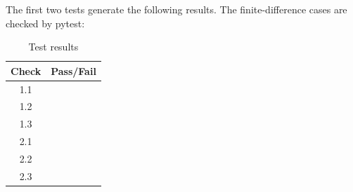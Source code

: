 The first two tests generate the following results. The finite-difference cases are checked by pytest:
\begin{table}[H]
	\caption{Test results}
	\label{tab:results}
	\centering \fontsize{10}{10}\selectfont
	\begin{tabular}{c | c  } %
		\hline\hline
		\textbf{Check} 						  		&\textbf{Pass/Fail} \\
		\hline
	   1.1	   			&  \\
	   1.2	   			&  \\
	   1.3	   			&  \\
	   2.1	   			&  \\
	   2.2	   			&  \\
	   2.3	   			&  \\
	   \hline\hline
	\end{tabular}
\end{table}
